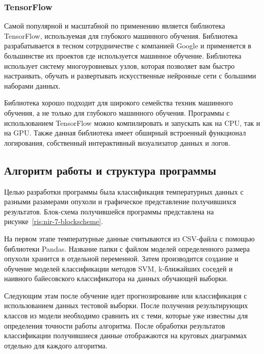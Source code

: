 \subsubsection{TensorFlow}
Самой популярной и масштабной по применению является библиотека TensorFlow, используемая для глубокого машинного обучения. Библиотека разрабатывается в тесном сотрудничестве с компанией Google и применяется в большинстве их проектов где используется машинное обучение. Библиотека использует систему многоуровневых узлов, которая позволяет вам быстро настраивать, обучать и развертывать искусственные нейронные сети с большими наборами данных.
\par
Библиотека хорошо подходит для широкого семейства техник машинного обучения, а не только для глубокого машинного обучения. Программы с использованием TensorFlow можно компилировать и запускать как на CPU, так и на GPU. Также данная библиотека имеет обширный встроенный функционал логирования, собственный интерактивный визуализатор данных и логов.

\subsection{Алгоритм работы и структура программы}
Целью разработки программы была классификация температурных данных с разными разамерами опухоли и графическое представление получившихся результатов. Блок-схема получившейся программы представлена на рисунке~\ref{ris:nir-7-blockscheme}. 
\par
На первом этапе температурные данные считываются из CSV-файла с помощью библиотеки Pandas. Название папки с файлом моделей определенного размера опухоли хранится в отдельной переменной. Затем производится создание и обучение моделей классификации методов SVM, k-ближайших соседей и наивного байесовского классификатора на данных обучающей выборки.
\par
Следующим этам  после обучение идет прогнозирование или классификация с использованием данных тестовой выборки. После получения результирующих классов из модели необходимо сравнить их с теми, которые уже известны для определения точности работы алгоритма. После обработки результатов классификации получившиеся данные отображаются на круговых диаграммах отдельно для каждого алгоритма.

